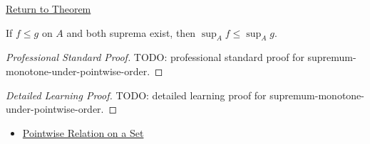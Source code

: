 \newpage
{}
\label{prf:supremum-monotone-under-pointwise-order}

\begin{remark*}[Return]
\hyperref[thm:supremum-monotone-under-pointwise-order]{Return to Theorem}
\end{remark*}

\begin{theorem*}
If \(f\leq g\) on \(A\) and both suprema exist, then \(\sup_A f\leq\sup_A g\).
\end{theorem*}

\begin{proof}[Professional Standard Proof]
\LRAProofBodyStart
TODO: professional standard proof for supremum-monotone-under-pointwise-order.
\end{proof}

\begin{proof}[Detailed Learning Proof]
\LRAProofBodyStart
TODO: detailed learning proof for supremum-monotone-under-pointwise-order.
\end{proof}

\begin{remark*}
\end{remark*}

\begin{dependencies}
\begin{itemize}
  \item \hyperref[def:pointwise-relation-on-set]{Pointwise Relation on a Set}
\end{itemize}
\end{dependencies}

\clearpage
